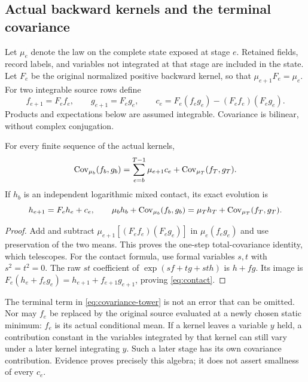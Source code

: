 \subsection{Actual backward kernels and the terminal covariance}

Let $\mu_e$ denote the law on the complete state exposed at stage $e$. Retained fields, record labels, and variables not integrated at that stage are included in the state. Let $F_e$ be the original normalized positive backward kernel, so that $\mu_{e+1}F_e=\mu_e$. For two integrable source rows define
\begin{equation}\label{eq:source-evolution}
 f_{e+1}=F_ef_e,\qquad g_{e+1}=F_eg_e,\qquad
 c_e=F_e(f_eg_e)-(F_ef_e)(F_eg_e).
\end{equation}
Products and expectations below are assumed integrable. Covariance is bilinear, without complex conjugation.

\begin{proposition}\label{prop:covariance}
For every finite sequence of the actual kernels,
\begin{equation}\label{eq:covariance-tower}
 \operatorname{Cov}_{\mu_b}(f_b,g_b)
 =\sum_{e=b}^{T-1}\mu_{e+1}c_e+
       \operatorname{Cov}_{\mu_T}(f_T,g_T).
\end{equation}
If $h_b$ is an independent logarithmic mixed contact, its exact evolution is
\begin{equation}\label{eq:contact}
 h_{e+1}=F_eh_e+c_e,
 \qquad
 \mu_bh_b+\operatorname{Cov}_{\mu_b}(f_b,g_b)
 =\mu_Th_T+\operatorname{Cov}_{\mu_T}(f_T,g_T).
\end{equation}
\end{proposition}

\begin{proof}
Add and subtract $\mu_{e+1}[(F_ef_e)(F_eg_e)]$ in $\mu_e(f_eg_e)$ and use preservation of the two means. This proves the one-step total-covariance identity, which telescopes. For the contact formula, use formal variables $s,t$ with $s^2=t^2=0$. The raw $st$ coefficient of $\exp(sf+tg+st h)$ is $h+fg$. Its image is $F_e(h_e+f_eg_e)=h_{e+1}+f_{e+1}g_{e+1}$, proving \eqref{eq:contact}.
\end{proof}

The terminal term in \eqref{eq:covariance-tower} is not an error that can be omitted. Nor may $f_e$ be replaced by the original source evaluated at a newly chosen static minimum: $f_e$ is its actual conditional mean. If a kernel leaves a variable $y$ held, a contribution constant in the variables integrated by that kernel can still vary under a later kernel integrating $y$. Such a later stage has its own covariance contribution. Evidence  proves precisely this algebra; it does not assert smallness of every $c_e$.

